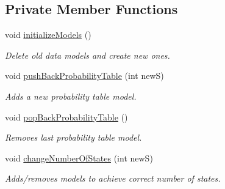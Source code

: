 \subsection*{Private Member Functions}
\begin{DoxyCompactItemize}
\item 
void \hyperlink{classSGGameHandler_af80ac7a33ba124153e2be5528dbce4b7}{initialize\+Models} ()
\begin{DoxyCompactList}\small\item\em Delete old data models and create new ones. \end{DoxyCompactList}\item 
\mbox{\label{classSGGameHandler_aef123beababcf909074f05772fbe88da}} 
void \hyperlink{classSGGameHandler_aef123beababcf909074f05772fbe88da}{push\+Back\+Probability\+Table} (int newS)
\begin{DoxyCompactList}\small\item\em Adds a new probability table model. \end{DoxyCompactList}\item 
\mbox{\label{classSGGameHandler_a1b0499f2c29bc69ee73b0b7fa0678858}} 
void \hyperlink{classSGGameHandler_a1b0499f2c29bc69ee73b0b7fa0678858}{pop\+Back\+Probability\+Table} ()
\begin{DoxyCompactList}\small\item\em Removes last probability table model. \end{DoxyCompactList}\item 
\mbox{\label{classSGGameHandler_a7ea037a5ccc43686fad7f64944e65f82}} 
void \hyperlink{classSGGameHandler_a7ea037a5ccc43686fad7f64944e65f82}{change\+Number\+Of\+States} (int newS)
\begin{DoxyCompactList}\small\item\em Adds/removes models to achieve correct number of states. \end{DoxyCompactList}\end{DoxyCompactItemize}
